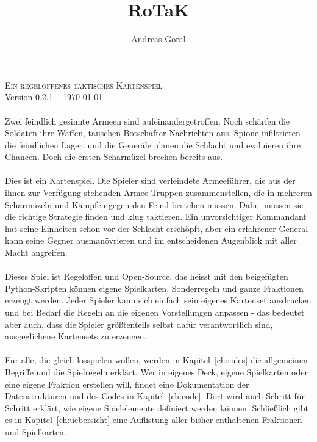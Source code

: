 \documentclass[a4paper,11pt]{report}
\title{RoTaK}
\author{Andreas Goral}
\newcommand{\cref}[1]{Kapitel~\ref{#1}}
\begin{document}
\begin{titlepage}
\begin{center}
\textsc{
{\huge Ein regeloffenes taktisches Kartenspiel}}\\[0.5cm]
Version 0.2.1 -- \today \\
\vfill
\end{center}
\end{titlepage}
\tableofcontents
\newpage

\paragraph{}
Zwei feindlich gesinnte Armeen sind aufeinandergetroffen. Noch schärfen die Soldaten ihre Waffen, tauschen Botschafter Nachrichten aus. Spione infiltrieren die feindlichen Lager, und die Generäle planen die Schlacht und evaluieren ihre Chancen. Doch die ersten Scharmüzel brechen bereits aus.

\paragraph{}
Dies ist ein Kartenspiel. Die Spieler sind verfeindete Armeeführer, die aus der ihnen zur Verfügung stehenden Armee Truppen zusammenstellen, die in mehreren Scharmüzeln und Kämpfen gegen den Feind bestehen müssen. Dabei müssen sie die richtige Strategie finden und klug taktieren. Ein unvorsichtiger Kommandant hat seine Einheiten schon vor der Schlacht erschöpft, aber ein erfahrener General kann seine Gegner ausmanövrieren und im entscheidenen Augenblick mit aller Macht angreifen.

\paragraph{}
Dieses Spiel ist Regeloffen und Open-Source, das heisst mit den beigefügten Python-Skripten können eigene Spielkarten, Sonderregeln und ganze Fraktionen erzeugt werden. Jeder Spieler kann sich einfach sein eigenes Kartenset ausdrucken und bei Bedarf die Regeln an die eigenen Vorstellungen anpassen - das bedeutet aber auch, dass die Spieler größtenteils selbst dafür verantwortlich sind, ausgeglichene Kartensets zu erzeugen.

\paragraph{}
Für alle, die gleich losspielen wollen, werden in \cref{ch:rules} die allgemeinen Begriffe und die Spielregeln erklärt. Wer in eigenes Deck, eigene Spielkarten oder eine eigene Fraktion erstellen will, findet eine Dokumentation der Datenstrukturen und des Codes in \cref{ch:code}. Dort wird auch Schritt-für-Schritt erklärt, wie eigene Spielelemente definiert werden können. Schließlich gibt es in \cref{ch:uebersicht} eine Auflistung aller bisher enthaltenen Fraktionen und Spielkarten.
\end{document}
